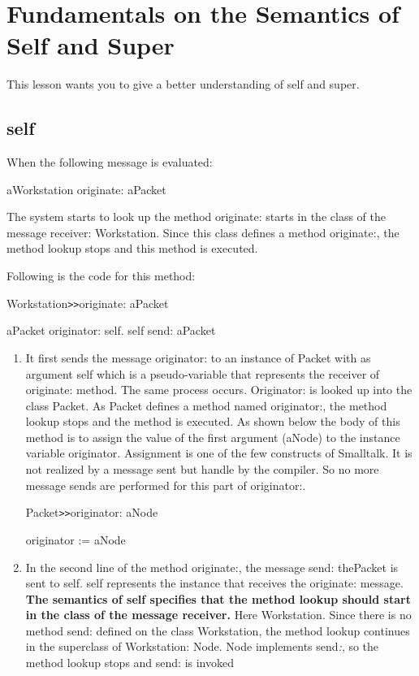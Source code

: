 \chapter{Fundamentals on the Semantics of Self and Super}


This lesson wants you to give a better understanding of self 
and super. 

\section{self}

When the following message is evaluated: 

\begin{code}
aWorkstation originate: aPacket
\end{code}

The system starts to look up the method originate: starts in 
the class of the message receiver: Workstation. Since this class 
defines a method originate:, the method lookup stops and this 
method is executed.

Following is the code for this method:

\begin{code}
Workstation\texttt{>>}originate: aPacket

   aPacket originator: self.
   self send: aPacket
\end{code}

\begin{enumerate}
    \item
It first sends the message originator: to an instance of Packet with 
as argument self which is a pseudo-variable that represents the 
receiver of originate: method. The same process occurs. Originator: 
is looked up into the class Packet. As Packet defines a method 
named originator:, the method lookup stops and the method is executed. 
As shown below the body of this method is to assign the value 
of the first argument (aNode) to the instance variable originator. 
Assignment is one of the few constructs of Smalltalk. It is not 
realized by a message sent but handle by the compiler. So no 
more message sends are performed for this part of originator:.

\begin{code}
Packet\texttt{>>}originator: aNode

      originator := aNode
\end{code}

\item
In the second line of the method originate:, the message send: 
thePacket is sent to self. self represents the instance that receives 
the originate: message. \textbf{The semantics of self specifies that 
the method lookup should start in the class of the message receiver.} 
Here Workstation. Since there is no method send: defined on the 
class Workstation, the method lookup continues in the superclass 
of Workstation: Node. Node implements send\textit{:}, so the method 
lookup stops and send: is invoked

\end{enumerate}

